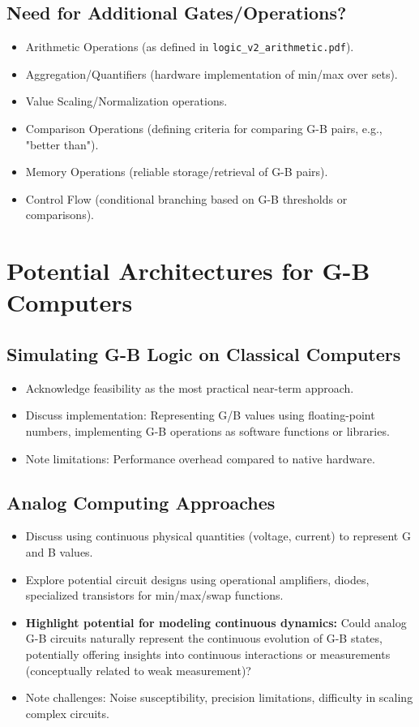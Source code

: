 \documentclass{article}
\begin{document}
\subsection{Need for Additional Gates/Operations?}
\begin{itemize}
    \item Arithmetic Operations (as defined in \texttt{logic\_v2\_arithmetic.pdf}).
    \item Aggregation/Quantifiers (hardware implementation of min/max over sets).
    \item Value Scaling/Normalization operations.
    \item Comparison Operations (defining criteria for comparing G-B pairs, e.g., "better than").
    \item Memory Operations (reliable storage/retrieval of G-B pairs).
    \item Control Flow (conditional branching based on G-B thresholds or comparisons).
\end{itemize}

\section{Potential Architectures for G-B Computers}

\subsection{Simulating G-B Logic on Classical Computers}
\begin{itemize}
    \item Acknowledge feasibility as the most practical near-term approach.
    \item Discuss implementation: Representing G/B values using floating-point numbers, implementing G-B operations as software functions or libraries.
    \item Note limitations: Performance overhead compared to native hardware.
\end{itemize}

\subsection{Analog Computing Approaches}
\begin{itemize}
    \item Discuss using continuous physical quantities (voltage, current) to represent G and B values.
    \item Explore potential circuit designs using operational amplifiers, diodes, specialized transistors for min/max/swap functions.
    \item \textbf{Highlight potential for modeling continuous dynamics:} Could analog G-B circuits naturally represent the continuous evolution of G-B states, potentially offering insights into continuous interactions or measurements (conceptually related to weak measurement)?
    \item Note challenges: Noise susceptibility, precision limitations, difficulty in scaling complex circuits.
\end{itemize}
\end{document}
